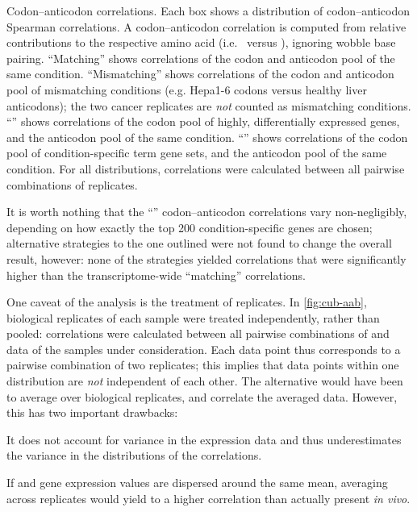     {Codon--anticodon correlations.}
    {Each box shows a distribution of codon--anticodon Spearman correlations.
    A codon--anticodon correlation is computed from relative contributions to
    the respective amino acid (i.e.\  versus ), ignoring
    wobble base pairing. “Matching” shows correlations of the codon and
    anticodon pool of the same condition. “Mismatching” shows correlations of
    the codon and anticodon pool of mismatching conditions (e.g. Hepa1-6 codons
    versus healthy liver anticodons); the two cancer replicates are \emph{not}
    counted as mismatching conditions. “” shows correlations of the
    codon pool of highly, differentially expressed \mrna genes, and the
    anticodon pool of the same condition. “” shows correlations of the
    codon pool of condition-specific  term gene sets, and the anticodon
    pool of the same condition. For all distributions, correlations were
    calculated between all pairwise combinations of replicates.}

It is worth nothing that the “” codon--anticodon correlations vary
non-negligibly, depending on how exactly the top \num{200} condition-specific
genes are chosen; alternative strategies to the one outlined were not found to
change the overall result, however: none of the strategies yielded correlations
that were significantly higher than the transcriptome-wide “matching”
correlations.

One caveat of the analysis is the treatment of replicates. In
\cref{fig:cub-aab}, biological replicates of each sample were treated
independently, rather than pooled: correlations were calculated between all
pairwise combinations of \rnaseq and  \chipseq data of the samples under
consideration. Each data point thus corresponds to a pairwise combination of two
replicates; this implies that data points within one distribution are \emph{not}
independent of each other. The alternative would have been to average over
biological replicates, and correlate the averaged data. However, this has two
important drawbacks:
\begin{enumerate*}
    \item It does not account for variance in the expression data and thus
        underestimates the variance in the distributions of the correlations.
    \item If \mrna and \trna gene expression values are dispersed around the
        same mean, averaging across replicates would yield to a higher
        correlation than actually present \textit{in vivo}.
\end{enumerate*}

